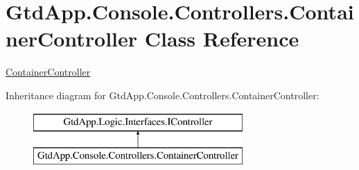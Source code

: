 \hypertarget{class_gtd_app_1_1_console_1_1_controllers_1_1_container_controller}{}\section{Gtd\+App.\+Console.\+Controllers.\+Container\+Controller Class Reference}
\label{class_gtd_app_1_1_console_1_1_controllers_1_1_container_controller}


\mbox{\hyperlink{class_gtd_app_1_1_console_1_1_controllers_1_1_container_controller}{Container\+Controller}}  


Inheritance diagram for Gtd\+App.\+Console.\+Controllers.\+Container\+Controller\+:\begin{figure}[H]
\begin{center}
\leavevmode
\includegraphics[height=2.000000cm]{class_gtd_app_1_1_console_1_1_controllers_1_1_container_controller}
\end{center}
\end{figure}
